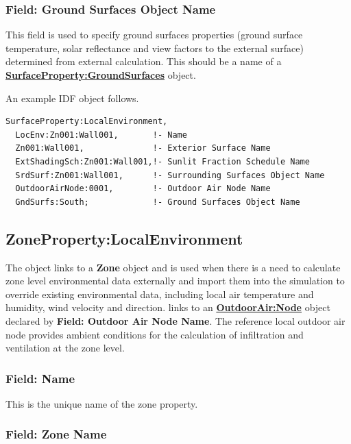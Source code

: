 \subsubsection{Field: Ground Surfaces Object Name}\label{field-ground-surfaces-object-name}

This field is used to specify ground surfaces properties (ground surface temperature, solar reflectance and view factors to the external surface) determined from external calculation. This should be a name of a \textbf{\hyperref[surfacePropertyGroundSurfaces]{SurfaceProperty:GroundSurfaces}} object.

An example IDF object follows.

\begin{lstlisting}
SurfaceProperty:LocalEnvironment,
  LocEnv:Zn001:Wall001,       !- Name
  Zn001:Wall001,              !- Exterior Surface Name
  ExtShadingSch:Zn001:Wall001,!- Sunlit Fraction Schedule Name
  SrdSurf:Zn001:Wall001,      !- Surrounding Surfaces Object Name
  OutdoorAirNode:0001,        !- Outdoor Air Node Name
  GndSurfs:South;             !- Ground Surfaces Object Name
\end{lstlisting}

\subsection{ZoneProperty:LocalEnvironment}\label{ZonePropertylocalEnvironment}

The object links to a \textbf{Zone} object and is used when there is a need to calculate zone level environmental data externally and import them into the simulation to override existing environmental data, including local air temperature and humidity, wind velocity and direction. links to an \textbf{\hyperref[outdoorairnode]{OutdoorAir:Node}} object declared by \textbf{Field: Outdoor Air Node Name}. The reference local outdoor air node provides ambient conditions for the calculation of infiltration and ventilation at the zone level.

\subsubsection{Field: Name}\label{field-zone-localenv-name}

This is the unique name of the zone property.

\subsubsection{Field: Zone Name}\label{ZonePropertylocalEnvironment-field-zone-name}

